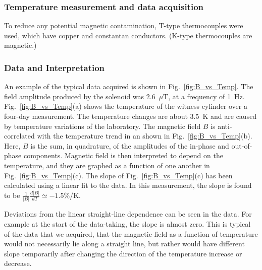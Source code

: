 \subsubsection{Temperature measurement and data acquisition}


To reduce any potential magnetic contamination, T-type thermocouples
were used, which have copper and constantan conductors.  (K-type
thermocouples are magnetic.)






\subsubsection{Data and Interpretation}

An example of the typical data acquired is shown in
Fig.~\ref{fig:B_vs_Temp}.  The field amplitude produced by the
solenoid was 2.6~$\mu$T, at a frequency of 1~Hz.
Fig.~\ref{fig:B_vs_Temp}(a) shows the temperature of the witness
cylinder over a four-day measurement.  The temperature changes are
about 3.5~K and are caused by temperature variations of the
laboratory.
%
%
The magnetic field $B$ is anti-correlated with the temperature trend
in an shown in Fig.~\ref{fig:B_vs_Temp}(b).  Here, $B$ is the sum, in
quadrature, of the amplitudes of the in-phase and out-of-phase
components.  Magnetic field is then interpreted to depend on the
temperature, and they are graphed as a function of one another in
Fig.~\ref{fig:B_vs_Temp}(c).  The slope of Fig.~\ref{fig:B_vs_Temp}(c)
has been calculated using a linear fit to the data.  In this
measurement, the slope is found to be
$\frac{1}{|B|}\frac{d|B|}{dT}\simeq -1.5\%$/K.

Deviations from the linear straight-line dependence can be seen in the
data.  For example at the start of the data-taking, the slope is
almost zero.  This is typical of the data that we acquired, that the
magnetic field as a function of temperature would not necessarily lie
along a straight line, but rather would have different slope
temporarily after changing the direction of the temperature increase
or decrease.

